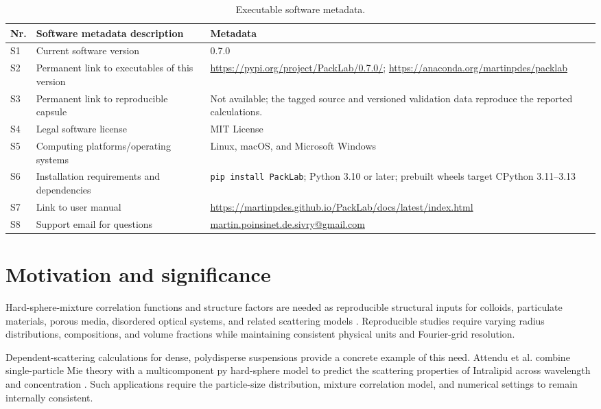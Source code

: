 \documentclass[preprint,12pt]{elsarticle}
\begin{document}
\begin{table}[t]
\centering
\footnotesize
\caption{Executable software metadata.}
\label{tab:software-metadata}
\begin{tabularx}{\textwidth}{@{}p{0.35in}p{2.25in}X@{}}
\toprule
Nr. & Software metadata description & Metadata \\
\midrule
S1 & Current software version & 0.7.0 \\
S2 & Permanent link to executables of this version & \url{https://pypi.org/project/PackLab/0.7.0/}; \url{https://anaconda.org/martinpdes/packlab} \\
S3 & Permanent link to reproducible capsule & Not available; the tagged source and versioned validation data reproduce the reported calculations. \\
S4 & Legal software license & MIT License \\
S5 & Computing platforms/operating systems & Linux, macOS, and Microsoft Windows \\
S6 & Installation requirements and dependencies & \texttt{pip install PackLab}; Python 3.10 or later; prebuilt wheels target CPython 3.11--3.13 \\
S7 & Link to user manual & \url{https://martinpdes.github.io/PackLab/docs/latest/index.html} \\
S8 & Support email for questions & \href{mailto:martin.poinsinet.de.sivry@gmail.com}{martin.poinsinet.de.sivry@gmail.com} \\
\bottomrule
\end{tabularx}
\end{table}

\section{Motivation and significance}

Hard-sphere-mixture correlation functions and structure factors are needed as reproducible structural inputs for colloids, particulate materials, porous media, disordered optical systems, and related scattering models \cite{HansenMcDonald2013,Torquato2002}. %
Reproducible studies require varying radius distributions, compositions, and volume fractions while maintaining consistent physical units and Fourier-grid resolution. %

Dependent-scattering calculations for dense, polydisperse suspensions provide a concrete example of this need. %
Attendu et al. combine single-particle Mie theory with a multicomponent \gls{py} hard-sphere model to predict the scattering properties of Intralipid across wavelength and concentration \cite{Attendu2026}. %
Such applications require the particle-size distribution, mixture correlation model, and numerical settings to remain internally consistent. %
\end{document}
